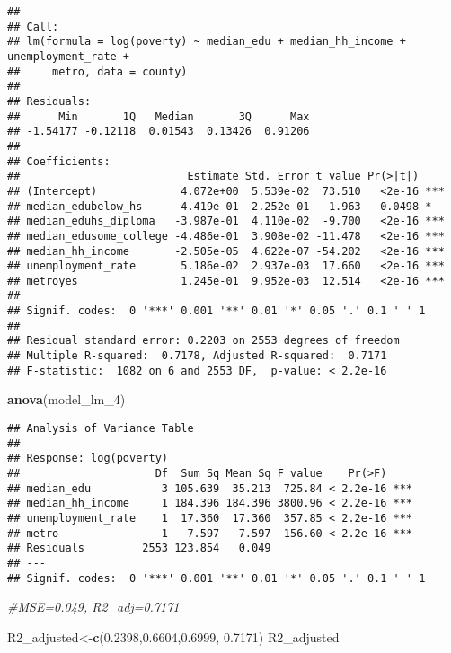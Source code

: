 \documentclass[
]{article}
\newenvironment{Shaded}{\begin{snugshade}}{\end{snugshade}}
\newcommand{\CommentTok}[1]{\textcolor[rgb]{0.56,0.35,0.01}{\textit{#1}}}
\newcommand{\FloatTok}[1]{\textcolor[rgb]{0.00,0.00,0.81}{#1}}
\newcommand{\FunctionTok}[1]{\textcolor[rgb]{0.13,0.29,0.53}{\textbf{#1}}}
\newcommand{\NormalTok}[1]{#1}
\newcommand{\OtherTok}[1]{\textcolor[rgb]{0.56,0.35,0.01}{#1}}
\begin{document}
\begin{verbatim}
## 
## Call:
## lm(formula = log(poverty) ~ median_edu + median_hh_income + unemployment_rate + 
##     metro, data = county)
## 
## Residuals:
##      Min       1Q   Median       3Q      Max 
## -1.54177 -0.12118  0.01543  0.13426  0.91206 
## 
## Coefficients:
##                          Estimate Std. Error t value Pr(>|t|)    
## (Intercept)             4.072e+00  5.539e-02  73.510   <2e-16 ***
## median_edubelow_hs     -4.419e-01  2.252e-01  -1.963   0.0498 *  
## median_eduhs_diploma   -3.987e-01  4.110e-02  -9.700   <2e-16 ***
## median_edusome_college -4.486e-01  3.908e-02 -11.478   <2e-16 ***
## median_hh_income       -2.505e-05  4.622e-07 -54.202   <2e-16 ***
## unemployment_rate       5.186e-02  2.937e-03  17.660   <2e-16 ***
## metroyes                1.245e-01  9.952e-03  12.514   <2e-16 ***
## ---
## Signif. codes:  0 '***' 0.001 '**' 0.01 '*' 0.05 '.' 0.1 ' ' 1
## 
## Residual standard error: 0.2203 on 2553 degrees of freedom
## Multiple R-squared:  0.7178, Adjusted R-squared:  0.7171 
## F-statistic:  1082 on 6 and 2553 DF,  p-value: < 2.2e-16
\end{verbatim}

\begin{Shaded}
\begin{Highlighting}[]
\FunctionTok{anova}\NormalTok{(model\_lm\_4)}
\end{Highlighting}
\end{Shaded}

\begin{verbatim}
## Analysis of Variance Table
## 
## Response: log(poverty)
##                     Df  Sum Sq Mean Sq F value    Pr(>F)    
## median_edu           3 105.639  35.213  725.84 < 2.2e-16 ***
## median_hh_income     1 184.396 184.396 3800.96 < 2.2e-16 ***
## unemployment_rate    1  17.360  17.360  357.85 < 2.2e-16 ***
## metro                1   7.597   7.597  156.60 < 2.2e-16 ***
## Residuals         2553 123.854   0.049                      
## ---
## Signif. codes:  0 '***' 0.001 '**' 0.01 '*' 0.05 '.' 0.1 ' ' 1
\end{verbatim}

\begin{Shaded}
\begin{Highlighting}[]
\CommentTok{\#MSE=0.049, R2\_adj=0.7171}

\NormalTok{R2\_adjusted}\OtherTok{\textless{}{-}}\FunctionTok{c}\NormalTok{(}\FloatTok{0.2398}\NormalTok{,}\FloatTok{0.6604}\NormalTok{,}\FloatTok{0.6999}\NormalTok{, }\FloatTok{0.7171}\NormalTok{)}
\NormalTok{R2\_adjusted}
\end{Highlighting}
\end{Shaded}
\end{document}
